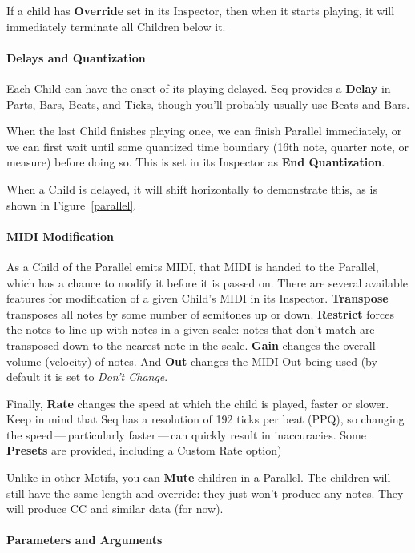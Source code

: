 \documentclass[twoside,10pt]{article}
\begin{document}
If a child has {\bf Override} set in its Inspector, then when it starts playing, it will immediately terminate all Children below it.  

\paragraph{Delays and Quantization}

Each Child can have the onset of its playing delayed.  Seq provides a {\bf Delay} in Parts, Bars, Beats, and Ticks, though you'll probably usually use Beats and Bars.

When the last Child finishes playing once, we can finish Parallel immediately, or we can first wait until some quantized time boundary (16th note, quarter note, or measure) before doing so.  This is set in its Inspector as {\bf End Quantization}.

When a Child is delayed, it will shift horizontally to demonstrate this, as is shown in Figure~\ref{parallel}.


\paragraph{MIDI Modification}

As a Child of the Parallel emits MIDI, that MIDI is handed to the Parallel, which has a chance to modify it before it is passed on.  There are several available features for modification of a given Child's MIDI in its Inspector.  {\bf Transpose} transposes all notes by some number of semitones up or down.  {\bf Restrict} forces the notes to line up with notes in a given scale: notes that don't match are transposed down to the nearest note in the scale.  {\bf Gain} changes the overall volume (velocity) of notes.  And {\bf Out} changes the MIDI Out being used (by default it is set to {\it Don't Change}.

Finally, {\bf Rate} changes the speed at which the child is played, faster or slower.  Keep in mind that Seq has a resolution of 192 ticks per beat (PPQ), so changing the speed\,---\,particularly faster\,---\,can quickly result in inaccuracies.    Some {\bf Presets} are provided, including a Custom Rate option)

Unlike in other Motifs, you can {\bf Mute} children in a Parallel.  The children will still have the same length and override: they just won't produce any notes.  They will produce CC and similar data (for now).

\paragraph{Parameters and Arguments}
\end{document}
